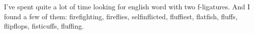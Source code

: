 I've spent quite a lot of time looking for english word with two f-ligatures.
And I found a few of them:
firefighting, fireflies, selfinflicted, fluffiest, flatfish,
fluffs, flipflops, fisticuffs, fluffing.
\bye
